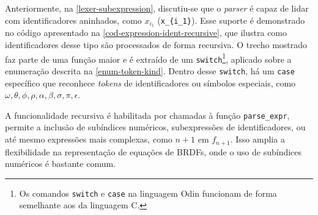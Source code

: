 Anteriormente, na \autoref{lexer-subexpression}, discutiu-se que o \textit{parser} é capaz de lidar com identificadores aninhados, como \( x_{i_1} \) (\verb"x_{i_1}"). Esse suporte é demonstrado no código apresentado na \autoref{cod-expression-ident-recursive}, que ilustra como identificadores desse tipo são processados de forma recursiva. O trecho mostrado faz parte de uma função maior e é extraído de um \texttt{switch}\footnote{Os comandos \texttt{switch} e \texttt{case} na linguagem Odin funcionam de forma semelhante aos da linguagem C.}, aplicado sobre a enumeração descrita na \autoref{enum-token-kind}. Dentro desse \texttt{switch}, há um \texttt{case} específico que reconhece \textit{tokens} de identificadores ou símbolos especiais, como \( \omega, \theta, \phi, \rho, \alpha, \beta, \sigma, \pi, \epsilon \).

A funcionalidade recursiva é habilitada por chamadas à função \texttt{parse\_expr}, permite a inclusão de subíndices numéricos, subexpressões de identificadores, ou até mesmo expressões mais complexas, como \( n+1 \) em \( f_{n+1} \). Isso amplia a flexibilidade na representação de equações de BRDFs, onde o uso de subíndices numéricos é bastante comum.






